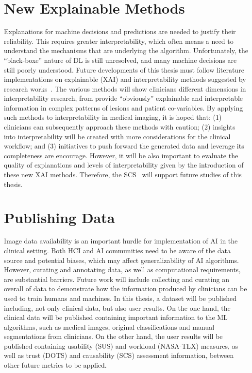 \section{New Explainable Methods}
\label{sec:sec008003}

Explanations for machine decisions and predictions are needed to justify their reliability.
This requires greater interpretability, which often means a need to understand the mechanisms that are underlying the algorithm.
Unfortunately, the ``black-boxe'' nature of \ac{DL} is still unresolved, and many machine decisions are still poorly understood.
Future developments of this thesis must follow literature implementations on explainable (\ac{XAI}) and interpretability methods suggested by research works~\cite{9233366}.
The various methods will show clinicians different dimensions in interpretability research, from provide ``obviously'' explainable and interpretable information in complex patterns of lesions and patient co-variables.
By applying such methods to interpretability in medical imaging, it is hoped that: (1) clinicians can subsequently approach these methods with caution; (2) insights into interpretability will be created with more considerations for the clinical workflow; and (3) initiatives to push forward the generated data and leverage its completeness are encourage.
However, it will be also important to evaluate the quality of explanations and levels of interpretability given by the introduction of these new \ac{XAI} methods.
Therefore, the \ac{SCS}~\cite{andreas2020measuring} will support future studies of this thesis.

\section{Publishing Data}
\label{sec:sec008004}

Image data availability is an important hurdle for implementation of \ac{AI} in the clinical setting.
Both \ac{HCI} and \ac{AI} communities need to be aware of the data source and potential biases, which may affect generalizability of \ac{AI} algorithms.
However, curating and annotating data, as well as computational requirements, are substantial barriers.
Future work will include collecting and curating an overall of data to demonstrate how the information produced by clinicians can be used to train humans and machines.
In this thesis, a dataset will be published including, not only clinical data, but also user results.
On the one hand, the clinical data will be published containing important information to the \ac{ML} algorithms, such as medical images, original classifications and manual segmentations from clinicians.
On the other hand, the user results will be published containing usability (\ac{SUS}) and workload (\ac{NASA-TLX}) measures, as well as trust (\ac{DOTS}) and causability (\ac{SCS}) assessment information, between other future metrics to be applied.